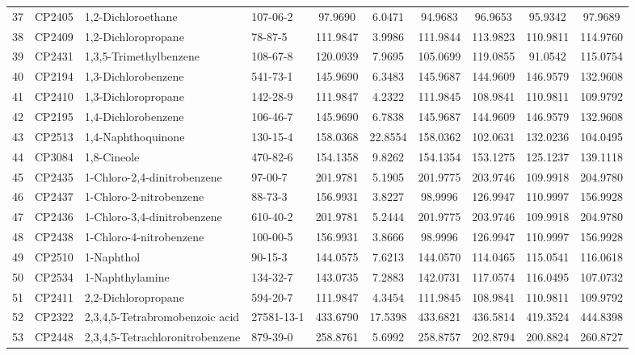 \begin{longtable}{clllcccccc}
37 & CP2405 & 1,2-Dichloroethane & 107-06-2 & 97.9690 & 6.0471 & 94.9683 & 96.9653 & 95.9342 & 97.9689 \\ 
38 & CP2409 & 1,2-Dichloropropane & 78-87-5 & 111.9847 & 3.9986 & 111.9844 & 113.9823 & 110.9811 & 114.9760 \\ 
39 & CP2431 & 1,3,5-Trimethylbenzene & 108-67-8 & 120.0939 & 7.9695 & 105.0699 & 119.0855 & 91.0542 & 115.0754 \\ 
40 & CP2194 & 1,3-Dichlorobenzene & 541-73-1 & 145.9690 & 6.3483 & 145.9687 & 144.9609 & 146.9579 & 132.9608 \\ 
41 & CP2410 & 1,3-Dichloropropane & 142-28-9 & 111.9847 & 4.2322 & 111.9845 & 108.9841 & 110.9811 & 109.9792 \\ 
42 & CP2195 & 1,4-Dichlorobenzene & 106-46-7 & 145.9690 & 6.7838 & 145.9687 & 144.9609 & 146.9579 & 132.9608 \\ 
43 & CP2513 & 1,4-Naphthoquinone & 130-15-4 & 158.0368 & 22.8554 & 158.0362 & 102.0631 & 132.0236 & 104.0495 \\ 
44 & CP3084 & 1,8-Cineole & 470-82-6 & 154.1358 & 9.8262 & 154.1354 & 153.1275 & 125.1237 & 139.1118 \\ 
45 & CP2435 & 1-Chloro-2,4-dinitrobenzene & 97-00-7 & 201.9781 & 5.1905 & 201.9775 & 203.9746 & 109.9918 & 204.9780 \\ 
46 & CP2437 & 1-Chloro-2-nitrobenzene & 88-73-3 & 156.9931 & 3.8227 & 98.9996 & 126.9947 & 110.9997 & 156.9928 \\ 
47 & CP2436 & 1-Chloro-3,4-dinitrobenzene & 610-40-2 & 201.9781 & 5.2444 & 201.9775 & 203.9746 & 109.9918 & 204.9780 \\ 
48 & CP2438 & 1-Chloro-4-nitrobenzene & 100-00-5 & 156.9931 & 3.8666 & 98.9996 & 126.9947 & 110.9997 & 156.9928 \\ 
49 & CP2510 & 1-Naphthol & 90-15-3 & 144.0575 & 7.6213 & 144.0570 & 114.0465 & 115.0541 & 116.0618 \\ 
50 & CP2534 & 1-Naphthylamine & 134-32-7 & 143.0735 & 7.2883 & 142.0731 & 117.0574 & 116.0495 & 107.0732 \\ 
51 & CP2411 & 2,2-Dichloropropane & 594-20-7 & 111.9847 & 4.3454 & 111.9845 & 108.9841 & 110.9811 & 109.9792 \\ 
52 & CP2322 & 2,3,4,5-Tetrabromobenzoic acid\smash{\textsuperscript{\textdaggerdbl}} & 27581-13-1 & 433.6790 & 17.5398 & 433.6821 & 436.5814 & 419.3524 & 444.8398 \\ 
53 & CP2448 & 2,3,4,5-Tetrachloronitrobenzene & 879-39-0 & 258.8761 & 5.6992 & 258.8757 & 202.8794 & 200.8824 & 260.8727 \\ 

\end{longtable}
